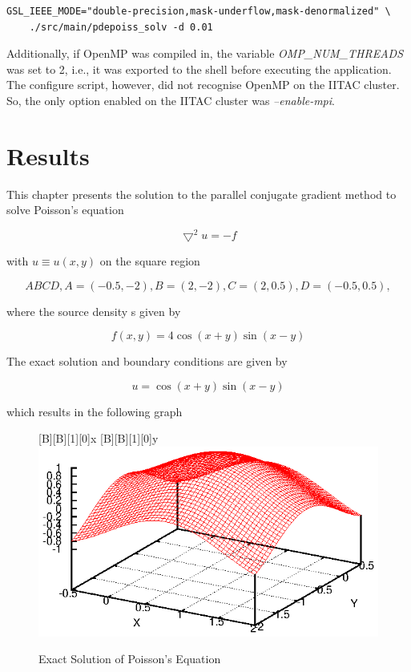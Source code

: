 \documentclass[12pt,a4paper]{report}
\begin{document}
\begin{verbatim}
GSL_IEEE_MODE="double-precision,mask-underflow,mask-denormalized" \
    ./src/main/pdepoiss_solv -d 0.01
\end{verbatim}

Additionally, if OpenMP was compiled in, the variable
\textit{OMP\_NUM\_THREADS} was set to 2, i.e., it was exported to the
shell before executing the application. The configure script, however,
did not recognise OpenMP on the IITAC cluster. So, the only option
enabled on the IITAC cluster was \textit{--enable-mpi}.

\chapter{Results}
\label{cha:results}

This chapter presents the solution to the parallel conjugate gradient
method to solve Poisson's equation

\begin{equation}
  \label{eq:poisson}
  \bigtriangledown^{2}u=-f
\end{equation}

with $u\equiv u(x,y)$ on the square region

\begin{equation}
  \label{eq:squareRegion}
  ABCD, A=(-0.5,-2), B=(2,-2), C=(2,0.5), D=(-0.5,0.5),
\end{equation}

where the source density s given by

\begin{equation}
  \label{eq:sourceDensity}
  f(x,y)=4\cos(x+y)\sin(x-y)
\end{equation}

The exact solution and boundary conditions are given by

\begin{equation}
  \label{eq:boundaryCond}
  u=\cos(x+y)\sin(x-y)
\end{equation}

which results in the following graph

\begin{figure}[htb]
  \centering
  [B][B][1][0]{x}
  [B][B][1][0]{y}
  \includegraphics{./images/exact.eps}
  \caption{Exact Solution of Poisson's Equation}
  \label{fig:exactPoiss}
\end{figure}
\end{document}
